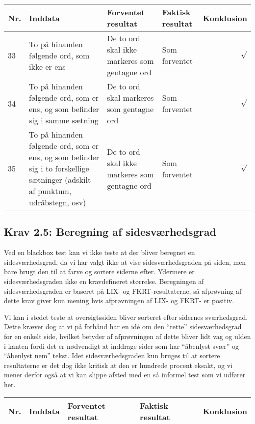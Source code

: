 \documentclass[a4paper,oneside,article]{memoir}
\begin{document}
\begin{landscape}
\begin{longtable}[c]{p{20pt}|p{220pt}|p{130pt}|p{130pt}|r}
\textbf{Nr.} &
\textbf{Inddata} &
\textbf{Forventet resultat} &
\textbf{Faktisk resultat} &
\textbf{Konklusion} \\ \hline

33 &
To på hinanden følgende ord, som ikke er ens &
De to ord skal ikke markeres som gentagne ord &
Som forventet &
$\surd$ \\ \hline

34 &
To på hinanden følgende ord, som er ens, og som befinder sig i samme
sætning &
De to ord skal markeres som gentagne ord &
Som forventet &
$\surd$ \\ \hline

35 &
To på hinanden følgende ord, som er ens, og som befinder sig i
to forskellige sætninger (adskilt af punktum, udråbstegn, osv) &
De to ord skal ikke markeres som gentagne ord &
Som forventet &
$\surd$ \\ \hline

\end{longtable}

\subsection{Krav 2.5: Beregning af sidesværhedsgrad}
Ved en blackbox test kan vi ikke teste at der bliver beregnet en
sidesværhedsgrad, da vi har valgt ikke at vise sidesværhedsgraden på
siden, men bare brugt den til at farve og sortere siderne
efter. Ydermere er sidesværhedsgraden ikke en kravdefineret
størrelse. Beregningen af sidesværhedsgraden er baseret på LIX- og
FKRT-resultaterne, så afprøvning af dette krav giver kun mening hvis
afprøvningen af LIX- og FKRT- er positiv.

Vi kan i stedet teste at oversigtssiden bliver sorteret efter sidernes
sværhedsgrad. Dette kræver dog at vi på forhånd har en idé om den
``rette'' sidesværhedsgrad for en enkelt side, hvilket betyder af
afprøvningen af dette bliver lidt vag og ulden i kanten fordi det er
nødvendigt at inddrage sider som har ``åbenlyst svær'' og ``åbenlyst
nem'' tekst. Idet sidesværhedsgraden kun bruges til at sortere
resultaterne er det dog ikke kritisk at den er hundrede procent
eksakt, og vi mener derfor også at vi kan slippe afsted med en så
informel test som vi udfører her.

\begin{longtable}[c]{p{20pt}|p{220pt}|p{130pt}|p{130pt}|r}
\textbf{Nr.} &
\textbf{Inddata} &
\textbf{Forventet resultat} &
\textbf{Faktisk resultat} &
\textbf{Konklusion} \\ \hline


\end{longtable}
\end{landscape}
\end{document}
